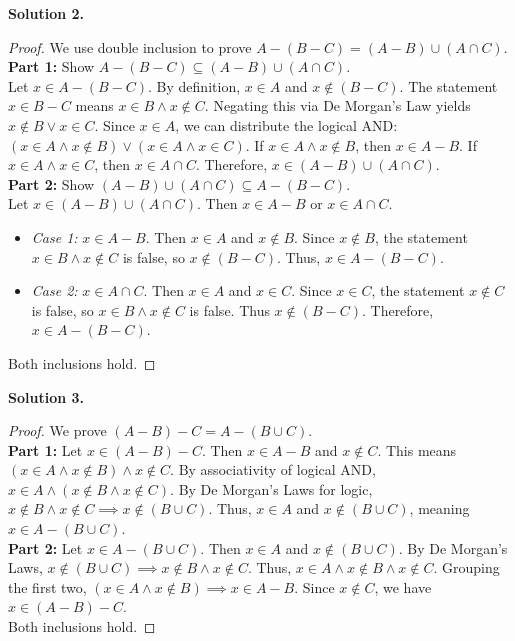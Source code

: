 \documentclass[11pt]{article}
\begin{document}
\noindent \textbf{Solution 2.}
\begin{proof}
We use double inclusion to prove $A - (B - C) = (A - B) \cup (A \cap C)$. \\
\textbf{Part 1:} Show $A - (B - C) \subseteq (A - B) \cup (A \cap C)$. \\
Let $x \in A - (B - C)$. By definition, $x \in A$ and $x \notin (B - C)$. The statement $x \in B - C$ means $x \in B \land x \notin C$. Negating this via De Morgan's Law yields $x \notin B \lor x \in C$. Since $x \in A$, we can distribute the logical AND: $(x \in A \land x \notin B) \lor (x \in A \land x \in C)$. 
If $x \in A \land x \notin B$, then $x \in A - B$. If $x \in A \land x \in C$, then $x \in A \cap C$. Therefore, $x \in (A - B) \cup (A \cap C)$. \\
\textbf{Part 2:} Show $(A - B) \cup (A \cap C) \subseteq A - (B - C)$. \\
Let $x \in (A - B) \cup (A \cap C)$. Then $x \in A - B$ or $x \in A \cap C$.
\begin{itemize}
    \item \textit{Case 1:} $x \in A - B$. Then $x \in A$ and $x \notin B$. Since $x \notin B$, the statement $x \in B \land x \notin C$ is false, so $x \notin (B - C)$. Thus, $x \in A - (B - C)$.
    \item \textit{Case 2:} $x \in A \cap C$. Then $x \in A$ and $x \in C$. Since $x \in C$, the statement $x \notin C$ is false, so $x \in B \land x \notin C$ is false. Thus $x \notin (B - C)$. Therefore, $x \in A - (B - C)$.
\end{itemize}
Both inclusions hold.
\end{proof}

\noindent \textbf{Solution 3.}
\begin{proof}
We prove $(A - B) - C = A - (B \cup C)$. \\
\textbf{Part 1:} Let $x \in (A - B) - C$. Then $x \in A - B$ and $x \notin C$. This means $(x \in A \land x \notin B) \land x \notin C$. By associativity of logical AND, $x \in A \land (x \notin B \land x \notin C)$. By De Morgan's Laws for logic, $x \notin B \land x \notin C \implies x \notin (B \cup C)$. Thus, $x \in A$ and $x \notin (B \cup C)$, meaning $x \in A - (B \cup C)$. \\
\textbf{Part 2:} Let $x \in A - (B \cup C)$. Then $x \in A$ and $x \notin (B \cup C)$. By De Morgan's Laws, $x \notin (B \cup C) \implies x \notin B \land x \notin C$. Thus, $x \in A \land x \notin B \land x \notin C$. Grouping the first two, $(x \in A \land x \notin B) \implies x \in A - B$. Since $x \notin C$, we have $x \in (A - B) - C$. \\
Both inclusions hold.
\end{proof}
\end{document}
